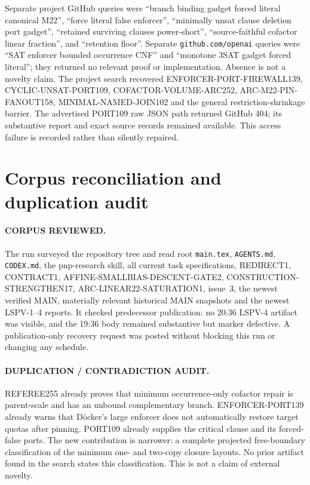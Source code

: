\documentclass[11pt]{article}
\begin{document}
Separate project GitHub queries were ``branch binding gadget forced literal
canonical M22'', ``force literal false enforcer'', ``minimally unsat clause
deletion port gadget'', ``retained surviving clauses power-short'',
``source-faithful cofactor linear fraction'', and ``retention floor''.
Separate \texttt{github.com/openai} queries were ``SAT enforcer bounded
occurrence CNF'' and ``monotone 3SAT gadget forced literal''; they returned no
relevant proof or implementation.  Absence is not a novelty claim.  The
project search recovered ENFORCER-PORT-FIREWALL139, CYCLIC-UNSAT-PORT109,
COFACTOR-VOLUME-ARC252, ARC-M22-PIN-FANOUT158, MINIMAL-NAMED-JOIN102 and the
general restriction-shrinkage barrier.  The advertised PORT109 raw JSON path
returned GitHub 404; its substantive report and exact source records remained
available.  This access failure is recorded rather than silently repaired.

\section{Corpus reconciliation and duplication audit}

\paragraph{CORPUS REVIEWED.}
The run surveyed the repository tree and read root \texttt{main.tex},
\texttt{AGENTS.md}, \texttt{CODEX.md}, the pnp-research skill, all current task
specifications, REDIRECT1, CONTRACT1, AFFINE-SMALLBIAS-DESCENT-GATE2,
CONSTRUCTION-STRENGTHEN17, ARC-LINEAR22-SATURATION1, issue~3, the newest
verified MAIN, materially relevant historical MAIN snapshots and the newest
LSPV-1--4 reports.  It checked predecessor publication: no 20:36 LSPV-4
artifact was visible, and the 19:36 body remained substantive but marker
defective.  A publication-only recovery request was posted without blocking
this run or changing any schedule.

\paragraph{DUPLICATION / CONTRADICTION AUDIT.}
REFEREE255 already proves that minimum occurrence-only cofactor repair is
parent-scale and has an unbound complementary branch.  ENFORCER-PORT139 already
warns that D\"ocker's large enforcer does not automatically restore target
quotas after pinning.  PORT109 already supplies the critical clause and its
forced-false ports.  The new contribution is narrower: a complete projected
free-boundary classification of the minimum one- and two-copy closure layouts.
No prior artifact found in the search states this classification.  This is not
a claim of external novelty.
\end{document}
